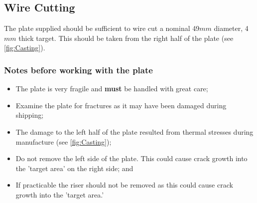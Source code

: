 \subsection{Wire Cutting}
The \MgZnCa plate supplied should be sufficient to wire cut a nominal 49$mm$ diameter, 4$mm$ thick target. This should be taken from the right half of the plate (see \ref{fig:Casting}). 

\subsubsection{Notes before working with the \MgZnCa plate}
\begin{itemize}
\item The \MgZnCa plate is very fragile and \textbf{must} be handled with great care; 
\item Examine the plate for fractures as it may have been damaged during shipping; 
\item The damage to the left half of the plate resulted from thermal stresses during manufacture (see \ref{fig:Casting});
\item Do not remove the left side of the plate. This could cause crack growth into the 'target area' on the right side; and
\item If practicable the riser should not be removed as this could cause crack growth into the 'target area.'
\end{itemize}